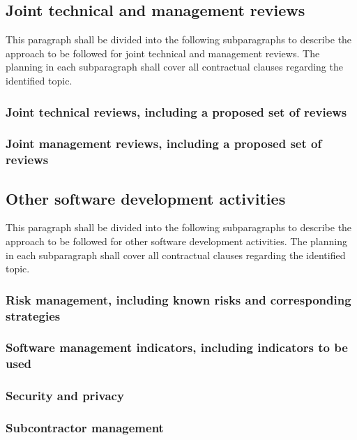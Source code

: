 \documentclass{fidata-report-template}
\begin{document}
\subsection{Joint technical and management reviews}

This paragraph shall be divided into the following subparagraphs to
describe the approach to be followed for joint technical and management
reviews. The planning in each subparagraph shall cover all contractual
clauses regarding the identified topic.

\subsubsection{Joint technical reviews, including a proposed set of
reviews}

\subsubsection{Joint management reviews, including a proposed set of
reviews}

\subsection{Other software development activities}

This paragraph shall be divided into the following subparagraphs to
describe the approach to be followed for other software development
activities. The planning in each subparagraph shall cover all
contractual clauses regarding the identified topic.

\subsubsection{Risk management, including known risks and corresponding
strategies}

\subsubsection{Software management indicators, including indicators to
be used}

\subsubsection{Security and privacy}

\subsubsection{Subcontractor management}
\end{document}
